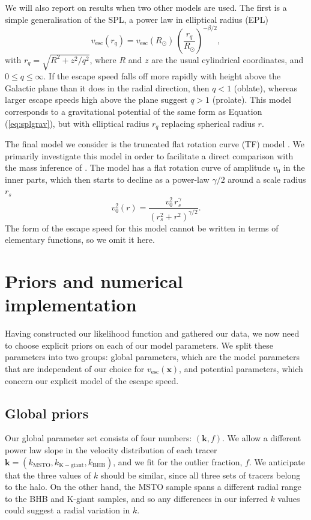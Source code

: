 \documentclass[useAMS,twocolumn,usenatbib]{mn2e}
\def\vesc{{v_\mathrm{esc}}}
\def\pos{{\boldsymbol{x}}}
\begin{document}
We will also report on results when two other models are used. 
The first is a simple generalisation of the SPL, a power law in elliptical radius (EPL)
%
\begin{equation}
\vesc(r_q) = \vesc(R_\odot)\,\left(\dfrac{r_q}{R_\odot}\right)^{-\beta/2},
\end{equation}
%
with $r_q = \sqrt{R^2 + z^2/q^2}$, where $R$ and $z$ are the usual cylindrical coordinates, and $0 \leq q \leq \infty$. 
If the escape speed falls off more rapidly with height above the Galactic plane than it does in the radial direction, then $q<1$ (oblate), whereas larger escape speeds high above the plane suggest $q>1$ (prolate). 
This model corresponds to a gravitational potential of the same form as Equation (\ref{eq:splgrav}), but with elliptical radius $r_q$ replacing spherical radius $r$.

The final model we consider is the truncated flat rotation curve (TF) model \citep[see][]{Gi14,Wi99}. 
We primarily investigate this model in order to facilitate a direct comparison with the mass inference of \citet{Gi14}.
The model has a flat rotation curve of amplitude $v_0$ in the inner parts, which then starts to decline as a power-law $\gamma/2$ around a scale radius $r_s$
%
\begin{equation}
v_0^2(r) = \dfrac{v_0^2\,r_s^\gamma}{(r_s^2 + r^2)^{\gamma/2}}.
\end{equation}
%
The form of the escape speed for this model cannot be written in terms of elementary functions, so we omit it here.

\section{Priors and numerical implementation}

\label{sec:pannm}

Having constructed our likelihood function and gathered our data, we now need to choose explicit priors on each of our model parameters. 
We split these parameters into two groups: global parameters, which are the model parameters that are independent of our choice for $\vesc(\pos)$, and potential parameters, which concern our explicit model of the escape speed.

\subsection{Global priors}

Our global parameter set consists of four numbers: $(\boldsymbol{k},f)$. 
We allow a different power law slope in the velocity distribution of each tracer $\boldsymbol{k} = (k_\mathrm{MSTO},k_\mathrm{K-giant},k_\mathrm{BHB})$, and we fit for the outlier fraction, $f$. 
We anticipate that the three values of $k$ should be similar, since all three sets of tracers belong to the halo.
On the other hand, the MSTO sample spans a different radial range to the BHB and K-giant samples, and so any differences in our inferred $k$ values could suggest a radial variation in $k$.
\end{document}
